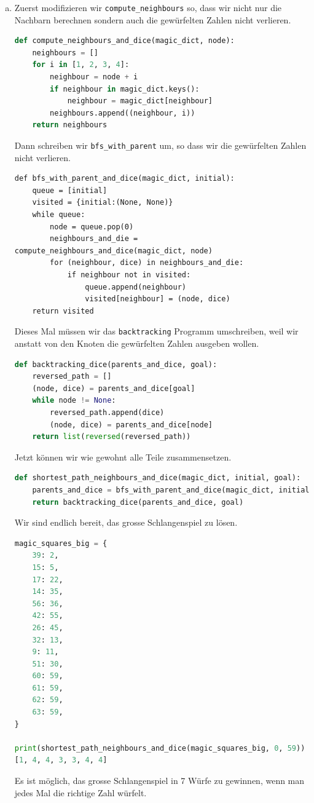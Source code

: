 \begin{enumerate}[(a)]
    \item Zuerst modifizieren wir \texttt{compute\_neighbours} so, dass wir nicht nur die Nachbarn berechnen sondern auch die gewürfelten Zahlen nicht verlieren.
    \begin{lstlisting}[language=Python]
def compute_neighbours_and_dice(magic_dict, node):
    neighbours = []
    for i in [1, 2, 3, 4]:
        neighbour = node + i
        if neighbour in magic_dict.keys():
            neighbour = magic_dict[neighbour]
        neighbours.append((neighbour, i))
    return neighbours
    \end{lstlisting}
    
    Dann schreiben wir \texttt{bfs\_with\_parent} um, so dass wir die gewürfelten Zahlen nicht verlieren.
    \begin{lstlisting}
def bfs_with_parent_and_dice(magic_dict, initial):
    queue = [initial]
    visited = {initial:(None, None)}
    while queue:
        node = queue.pop(0)
        neighbours_and_die = compute_neighbours_and_dice(magic_dict, node)
        for (neighbour, dice) in neighbours_and_die:
            if neighbour not in visited:
                queue.append(neighbour)
                visited[neighbour] = (node, dice)
    return visited
    \end{lstlisting}
    
    Dieses Mal müssen wir das \texttt{backtracking} Programm umschreiben, weil wir anstatt von den Knoten die gewürfelten Zahlen ausgeben wollen.
    \begin{lstlisting}[language=Python]
def backtracking_dice(parents_and_dice, goal):
    reversed_path = []
    (node, dice) = parents_and_dice[goal]
    while node != None:
        reversed_path.append(dice)
        (node, dice) = parents_and_dice[node]
    return list(reversed(reversed_path))
    \end{lstlisting}
    
    Jetzt können wir wie gewohnt alle Teile zusammensetzen.
    \begin{lstlisting}[language=Python]
def shortest_path_neighbours_and_dice(magic_dict, initial, goal):
    parents_and_dice = bfs_with_parent_and_dice(magic_dict, initial)
    return backtracking_dice(parents_and_dice, goal)
    \end{lstlisting}
    
    Wir sind endlich bereit, das grosse Schlangenspiel zu lösen.
    \begin{lstlisting}[language=Python]
magic_squares_big = {
    39: 2,
    15: 5,
    17: 22,
    14: 35,
    56: 36,
    42: 55,
    26: 45,
    32: 13,
    9: 11,
    51: 30,
    60: 59,
    61: 59,
    62: 59,
    63: 59,
}

print(shortest_path_neighbours_and_dice(magic_squares_big, 0, 59))
[1, 4, 4, 3, 3, 4, 4]
    \end{lstlisting}
    Es ist möglich, das grosse Schlangenspiel in 7 Würfe zu gewinnen, wenn man jedes Mal die richtige Zahl würfelt.
\end{enumerate}










